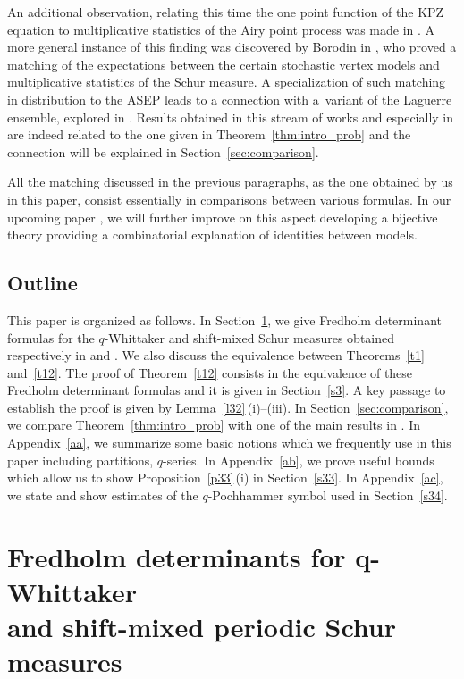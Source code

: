 \documentclass[pdftex]{sigma}
\numberwithin{equation}{section}
\begin{document}
 An additional observation, relating this time the one point function of the KPZ equation to multiplicative statistics of the Airy point process was made in \cite{Borodin-Gorin2016momentmatchKPZ}. A more general instance of this finding was discovered by Borodin in \cite{Borodin2018momentmatch}, who proved a matching of the expectations between the certain stochastic vertex models and multiplicative statistics of the Schur measure. A specialization of such matching in distribution to the ASEP leads to a connection with a~variant of the Laguerre ensemble, explored in \cite{Borodin-Olshanski2017ASEP-DPP}.
 Results obtained in this stream of works and especially in \cite{Borodin2018momentmatch} are indeed related to the one given in Theorem~\ref{thm:intro_prob} and the connection will be explained in Section~\ref{sec:comparison}.

 All the matching discussed in the previous paragraphs, as the one obtained by us in this paper, consist essentially in comparisons between various formulas. In our upcoming paper \cite{ImamuraMucciconiSasamoto2021skewRSK}, we will further improve on this aspect developing a bijective theory providing a combinatorial explanation of identities between models.

\subsection{Outline}
 This paper is organized as follows. In Section~\ref{s2}, we give Fredholm determinant formulas for the $q$-Whittaker and shift-mixed Schur measures obtained respectively in \cite{ImamuraSasamoto2019qTASEPtheta} and \cite{Borodin2007PeriodicSchur}.
 We also discuss the equivalence between Theorems~\ref{t1} and~\ref{t12}. The proof of Theorem~\ref{t12} consists in the equivalence of these Fredholm determinant formulas and it is given in Section~\ref{s3}. A key passage to establish the proof is given by Lemma~\ref{l32}\,(i)--(iii). In Section~\ref{sec:comparison}, we compare Theorem~\ref{thm:intro_prob} with one of the main results in \cite{Borodin2018momentmatch}. In Appendix~\ref{aa}, we summarize some basic notions which we frequently use in this paper including partitions, $q$-series. In Appendix~\ref{ab}, we prove useful bounds which allow us to show Proposition~\ref{p33}\,(i) in Section~\ref{s33}. In Appendix~\ref{ac}, we state
 and show estimates of the $q$-Pochhammer symbol used in Section~\ref{s34}.

\section[Fredholm determinants for q-Whittaker and shift-mixed periodic Schur measures]{Fredholm determinants for $\boldsymbol{q}$-Whittaker\\ and shift-mixed periodic Schur measures}
\label{s2}
\end{document}
